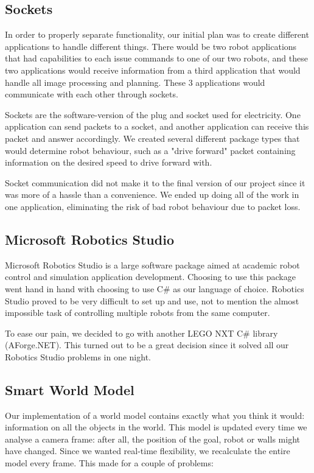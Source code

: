 \documentclass[10pt, abstracton, twocolumn]{scrartcl}
\begin{document}
\begin{appendices}
\subsection{Sockets}
In order to properly separate functionality, our initial plan was to create different applications to handle different things. There would be two robot applications that had capabilities to each issue commands to one of our two robots, and these two applications would receive information from a third application that would handle all image processing and planning. These 3 applications would communicate with each other through sockets.

Sockets are the software-version of the plug and socket used for electricity. One application can send packets to a socket, and another application can receive this packet and answer accordingly. We created several different package types that would determine robot behaviour, such as a "drive forward" packet containing information on the desired speed to drive forward with.

Socket communication did not make it to the final version of our project since it was more of a hassle than a convenience. We ended up doing all of the work in one application, eliminating the risk of bad robot behaviour due to packet loss.

\subsection{Microsoft Robotics Studio}
Microsoft Robotics Studio is a large software package aimed at academic robot control and simulation application development. Choosing to use this package went hand in hand with choosing to use C\# as our language of choice. Robotics Studio proved to be very difficult to set up and use, not to mention the almost impossible task of controlling multiple robots from the same computer.

To ease our pain, we decided to go with another LEGO NXT C\# library (AForge.NET). This turned out to be a great decision since it solved all our Robotics Studio problems in one night.

\subsection{Smart World Model}
Our implementation of a world model contains exactly what you think it would: information on all the objects in the world. This model is updated every time we analyse a camera frame: after all, the position of the goal, robot or walls might have changed. Since we wanted real-time flexibility, we recalculate the entire model every frame. This made for a couple of problems:


\end{appendices}
\end{document}
